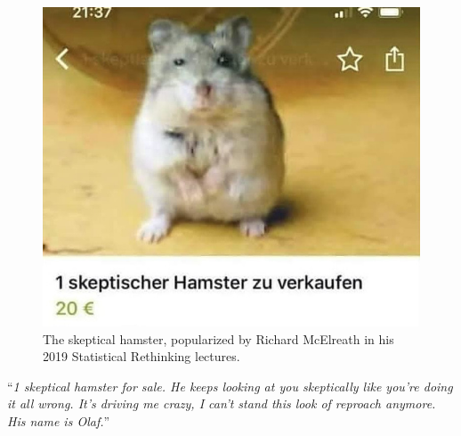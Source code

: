 \documentclass[article,30pt,extrafontsizes]{memoir}
\begin{document}
\begin{adjmulticols*}{2}{0.5in}{0.5in}
{\begin{figure}
{\centering \includegraphics{hamster3} 

}

\caption{The skeptical hamster, popularized by Richard McElreath in his 2019 Statistical Rethinking lectures.}\label{fig:unnamed-chunk-5}
\end{figure}

``\emph{1 skeptical hamster for sale. He keeps looking at you
skeptically like you're doing it all wrong. It's driving me crazy, I
can't stand this look of reproach anymore. His name is Olaf.}''
}
\end{adjmulticols*}
\end{document}
